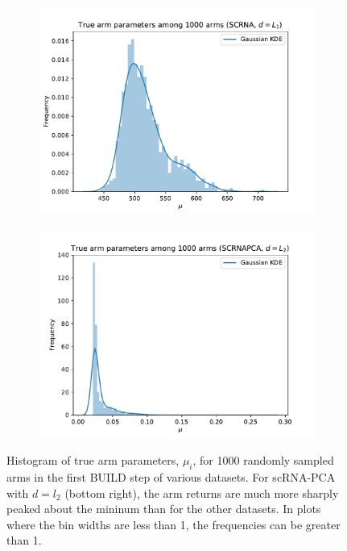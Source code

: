 \begin{figure}[ht]
\begin{subfigure}{.5\textwidth}
  \includegraphics[width=\linewidth]{figures/mu-SCRNA-L1.pdf}   
  \label{fig:mu_dist3}
\end{subfigure}
\begin{subfigure}{.5\textwidth}
  \centering
  \includegraphics[width=\linewidth]{figures/mu-SCRNAPCA-L2.pdf}   
  \label{fig:mu_dist4}
\end{subfigure}
\caption{Histogram of true arm parameters, $\mu_i$, for 1000 randomly sampled arms in the first BUILD step of various datasets. For scRNA-PCA with $d = l_2$ (bottom right), the arm returns are much more sharply peaked about the mininum than for the other datasets. In plots where the bin widths are less than 1, the frequencies can be greater than 1.}
\label{fig:mu_dist}
\end{figure}

